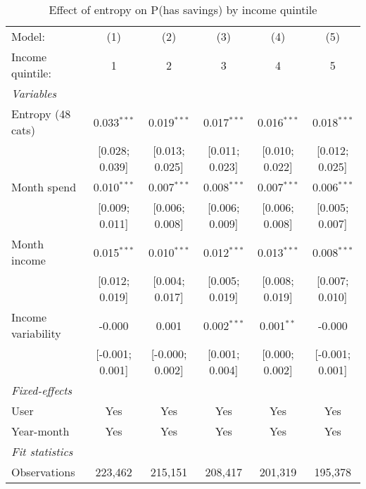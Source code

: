 
\begin{table}[htbp]
   \centering
   \tiny
   \begin{threeparttable}[b]
      \caption{\label{tab:reg_has_inflows_entropy_tag_spend_z_inc_quint} Effect of entropy on P(has savings) by income quintile}
      \begin{tabular}{lccccc}
         \tabularnewline \midrule \midrule
         Model:             & (1)             & (2)             & (3)            & (4)            & (5)\\  
         Income quintile:   & 1               & 2               & 3              & 4              & 5 \\   
         \midrule
         \emph{Variables}\\
         Entropy (48 cats)  & 0.033$^{***}$   & 0.019$^{***}$   & 0.017$^{***}$  & 0.016$^{***}$  & 0.018$^{***}$\\   
                            & [0.028; 0.039]  & [0.013; 0.025]  & [0.011; 0.023] & [0.010; 0.022] & [0.012; 0.025]\\   
         Month spend        & 0.010$^{***}$   & 0.007$^{***}$   & 0.008$^{***}$  & 0.007$^{***}$  & 0.006$^{***}$\\   
                            & [0.009; 0.011]  & [0.006; 0.008]  & [0.006; 0.009] & [0.006; 0.008] & [0.005; 0.007]\\   
         Month income       & 0.015$^{***}$   & 0.010$^{***}$   & 0.012$^{***}$  & 0.013$^{***}$  & 0.008$^{***}$\\   
                            & [0.012; 0.019]  & [0.004; 0.017]  & [0.005; 0.019] & [0.008; 0.019] & [0.007; 0.010]\\   
         Income variability & -0.000          & 0.001           & 0.002$^{***}$  & 0.001$^{**}$   & -0.000\\   
                            & [-0.001; 0.001] & [-0.000; 0.002] & [0.001; 0.004] & [0.000; 0.002] & [-0.001; 0.001]\\   
         \midrule
         \emph{Fixed-effects}\\
         User               & Yes             & Yes             & Yes            & Yes            & Yes\\  
         Year-month         & Yes             & Yes             & Yes            & Yes            & Yes\\  
         \midrule
         \emph{Fit statistics}\\
         Observations       & 223,462         & 215,151         & 208,417        & 201,319        & 195,378\\  

\end{tabular}
\end{threeparttable}
\end{table}
